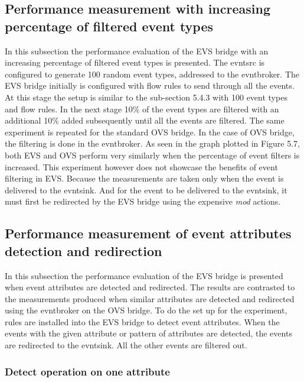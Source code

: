 \subsection{Performance measurement with increasing percentage of filtered event types}
In this subsection the performance evaluation of the EVS bridge with an increasing percentage of filtered event types is presented. The evntsrc is configured to generate 100 random event types, addressed to the evntbroker. The EVS bridge initially is configured with flow rules to send through all the events. At this stage the setup is similar to the sub-section 5.4.3 with 100 event types and flow rules. In the next stage 10\% of the event types are filtered with an additional 10\% added subsequently until all the events are filtered. The same experiment is repeated for the standard OVS bridge. In the case of OVS bridge, the filtering is done in the evntbroker. 
\newline
As seen in the graph plotted in Figure 5.7, both EVS and OVS perform very similarly when the percentage of event filters is increased. This  experiment however does not showcase the benefits of event filtering in EVS. Because the measurements are taken only when the event is delivered to the evntsink. And for the event to be delivered to the evntsink, it must first be redirected by the EVS bridge using the expensive \textit{mod} actions. 





\subsection{Performance measurement of event attributes detection and redirection}
In this subsection the performance evaluation of the EVS bridge is presented when event attributes are detected and redirected. The results are contrasted to the measurements produced when similar attributes are detected and redirected using the evntbroker on the OVS bridge. To do the set up for the experiment, rules are installed into the EVS bridge to detect event attributes. When the events with the given attribute or pattern of attributes are detected, the events are redirected to the evntsink. All the other events are filtered out. 

\subsubsection{Detect operation on one attribute}

